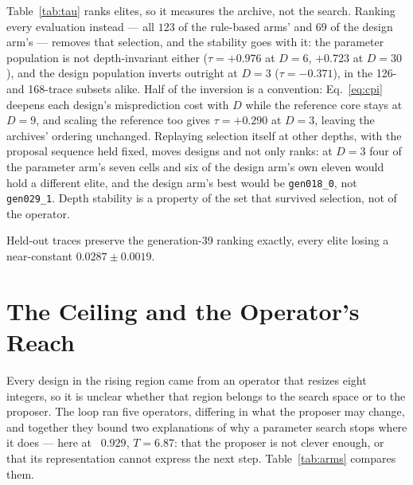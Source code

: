 \documentclass[conference]{IEEEtran}
\newcommand{\vfs}{\text{VFS}}
\begin{document}
Table~\ref{tab:tau} ranks elites, so it measures the archive, not the search.
Ranking every evaluation instead --- all $123$ of the rule-based arms' and $69$
of the design arm's --- removes that selection, and the stability goes with it:
the parameter population is not depth-invariant either ($\tau=+0.976$ at $D=6$,
$+0.723$ at $D=30$), and the design population inverts outright at $D=3$
($\tau=-0.371$), in the 126- and 168-trace subsets alike. Half of the inversion
is a convention: Eq.~\eqref{eq:cpi} deepens each design's misprediction cost
with $D$ while the reference core stays at $D=9$, and scaling the reference too
gives $\tau=+0.290$ at $D=3$, leaving the archives' ordering unchanged. Replaying selection itself at other depths, with the
proposal sequence held fixed, moves designs and not only ranks: at $D=3$ four of
the parameter arm's seven cells and six of the design arm's own eleven would
hold a different elite, and the design arm's best would be \texttt{gen018\_0},
not \texttt{gen029\_1}. Depth stability is a property of the set that survived
selection, not of the operator.

Held-out traces preserve the generation-39 ranking exactly, every elite losing
a near-constant $0.0287\pm0.0019$.

\section{The Ceiling and the Operator's Reach}
\label{sec:arms}

Every design in the rising region came from an operator that resizes eight
integers, so it is unclear whether that region belongs to the search space or to
the proposer. The loop ran five operators, differing in what the proposer may
change, and together they bound two explanations of why a parameter search stops
where it does --- here at \vfs{}~$0.929$, $T=6.87$: that the proposer is not
clever enough, or that its representation cannot express the next step.
Table~\ref{tab:arms} compares them.
\end{document}
